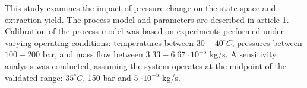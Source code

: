 \documentclass[../Article_Sensitivity_Analsysis.tex]{subfiles}
\begin{document}
	
	\label{CH: Results}
	
	
	This study examines the impact of pressure change on the state space and extraction yield. The process model and parameters are described in {\color{red}article 1}. Calibration of the process model was based on experiments performed under varying operating conditions: temperatures between $30 - 40^\circ C$, pressures between $100 - 200$ bar, and mass flow between $3.33-6.67 \cdot 10^{-5}$ kg/s. A sensitivity analysis was conducted, assuming the system operates at the midpoint of the validated range: $35^\circ C$, 150 bar and 5 $\cdot 10^{-5}$ kg/s.
	
        
    
    
	
\end{document}
